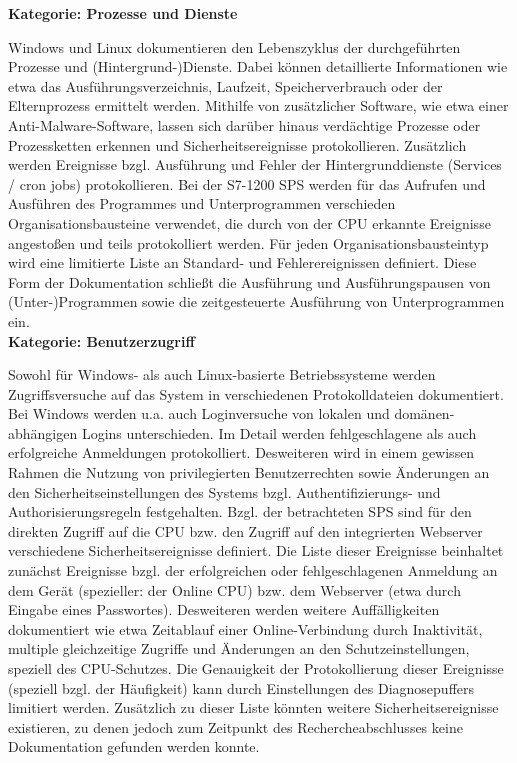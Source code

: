 \textbf{Kategorie: Prozesse und Dienste}

Windows und Linux dokumentieren den Lebenszyklus der durchgeführten Prozesse und (Hintergrund-)Dienste. Dabei können detaillierte Informationen wie etwa das Ausführungsverzeichnis, Laufzeit, Speicherverbrauch oder der Elternprozess ermittelt werden. Mithilfe von zusätzlicher Software, wie etwa einer Anti-Malware-Software, lassen sich darüber hinaus verdächtige Prozesse oder Prozessketten erkennen und Sicherheitsereignisse protokollieren. Zusätzlich werden Ereignisse bzgl. Ausführung und Fehler der Hintergrunddienste (Services / \glqq cron jobs\grqq ) protokollieren. Bei der S7-1200 SPS werden für das Aufrufen und Ausführen des Programmes und Unterprogrammen verschieden Organisationsbausteine verwendet, die durch von der CPU erkannte Ereignisse angestoßen und teils protokolliert werden. Für jeden Organisationsbausteintyp wird eine limitierte Liste an Standard- und Fehlerereignissen definiert. Diese Form der Dokumentation schließt die Ausführung und Ausführungspausen von (Unter-)Programmen sowie die zeitgesteuerte Ausführung von Unterprogrammen ein.\\

\textbf{Kategorie: Benutzerzugriff}

Sowohl für Windows- als auch Linux-basierte Betriebssysteme werden Zugriffsversuche auf das System in verschiedenen Protokolldateien dokumentiert. Bei Windows werden u.a. auch Loginversuche von lokalen und domänen-abhängigen Logins unterschieden. Im Detail werden fehlgeschlagene als auch erfolgreiche Anmeldungen protokolliert. Desweiteren wird in einem gewissen Rahmen die Nutzung von privilegierten Benutzerrechten sowie Änderungen an den Sicherheitseinstellungen des Systems bzgl. Authentifizierungs- und Authorisierungsregeln festgehalten. Bzgl. der betrachteten SPS sind für den direkten Zugriff auf die CPU bzw. den Zugriff auf den integrierten Webserver verschiedene Sicherheitsereignisse definiert. Die Liste dieser Ereignisse beinhaltet zunächst Ereignisse bzgl. der erfolgreichen oder fehlgeschlagenen Anmeldung an dem Gerät (spezieller: der Online CPU) bzw. dem Webserver (etwa durch Eingabe eines Passwortes). Desweiteren werden weitere Auffälligkeiten dokumentiert wie etwa Zeitablauf einer Online-Verbindung durch Inaktivität, multiple gleichzeitige Zugriffe und Änderungen an den Schutzeinstellungen, speziell des CPU-Schutzes. Die Genauigkeit der Protokollierung dieser Ereignisse (speziell bzgl. der Häufigkeit) kann durch Einstellungen des Diagnosepuffers limitiert werden. Zusätzlich zu dieser Liste könnten weitere Sicherheitsereignisse existieren, zu denen jedoch zum Zeitpunkt des Rechercheabschlusses keine Dokumentation gefunden werden konnte.\\  


